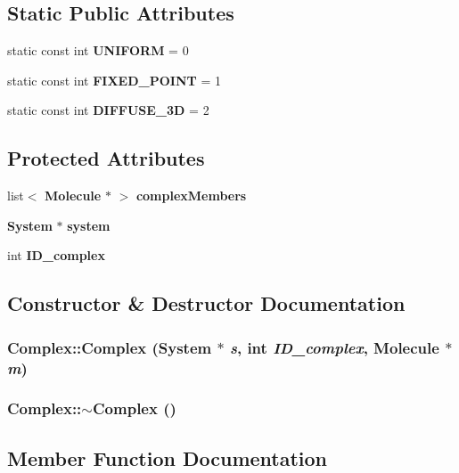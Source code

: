 \subsection*{Static Public Attributes}
\begin{CompactItemize}
\item 
static const int {\bf UNIFORM} = 0
\item 
static const int {\bf FIXED\_\-POINT} = 1
\item 
static const int {\bf DIFFUSE\_\-3D} = 2
\end{CompactItemize}
\subsection*{Protected Attributes}
\begin{CompactItemize}
\item 
list$<$ {\bf Molecule} $\ast$ $>$ {\bf complexMembers}
\item 
{\bf System} $\ast$ {\bf system}
\item 
int {\bf ID\_\-complex}
\end{CompactItemize}


\subsection{Constructor \& Destructor Documentation}
\subsubsection{\setlength{\rightskip}{0pt plus 5cm}Complex::Complex ({\bf System} $\ast$ {\em s}, int {\em ID\_\-complex}, {\bf Molecule} $\ast$ {\em m})}\label{classNFcore_1_1Complex_f21fb570112128eaf141081404504a67}


\subsubsection{\setlength{\rightskip}{0pt plus 5cm}Complex::$\sim$Complex ()}\label{classNFcore_1_1Complex_70e14b17c92e3da779686b98f9f3bb2d}




\subsection{Member Function Documentation}
